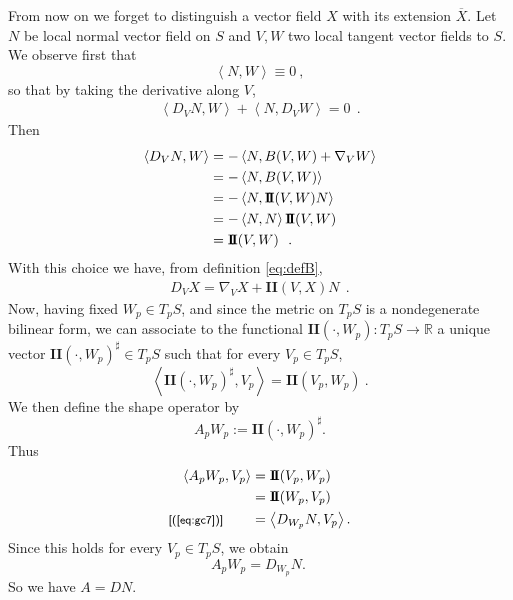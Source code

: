 \documentclass[a4paper,11pt,openright,twoside]{book}
\newcommand{\II}{\mathbf{I\!I}}
\newcommand{\1}{\mathds{1}}
\newcommand{\commb}[1]{\textsf{{\footnotesize[#1]}}}
\newcommand{\qref}[1]{(\ref{#1})}
\theoremstyle{plain}
\theoremstyle{definition}
\theoremstyle{remark}
\begin{document}
From now on we forget to distinguish a vector field $X$ with its extension $\overline{X}$. Let $N$ be local normal vector field on $S$ and $V,W$ two local tangent vector fields to $S$. We observe first that
\[\left<N,W \right> \equiv 0\ ,\] 
so that by taking the derivative along $V$,
\begin{align*}
	\left<D_V N,W \right> + \left<N,D_VW \right> = 0
	\ \ .
\end{align*}
Then
\begin{align}\label{eq:gc7}
	\left<D_VN,W \right> &= -\left<N,B(V,W)+\nabla_VW \right>\notag\\
	&= -\left<N,B(V,W) \right> \notag\\
	&= -\left<N,\II(V,W)N \right> \notag\\
	&= -\left<N,N \right>\II(V,W) \notag\\
	&=  \II(V,W)
\ \ . 
\end{align}
With this choice we have, from definition \ref{eq:defB},
\begin{align}\label{eq:gc1}
	\boxed{D_V X= \nabla_V X + \II(V,X)N }
\ \ . 
\end{align}
Now, having fixed $W_p\in T_pS$, and since the metric on $T_pS$ is a nondegenerate bilinear form, we can associate to the functional $\II(\cdot,W_p):T_pS\to \mathbb{R}$ a unique vector $\II(\cdot,W_p)^\sharp\in T_pS$ such that for every $V_p\in T_pS$,
\[
\left<\II(\cdot,W_p)^\sharp,V_p\right>=\II(V_p,W_p)\ .
\]
We then define the shape operator by
\[
A_pW_p:=\II(\cdot,W_p)^\sharp.
\]
Thus
\begin{align*}
\left<A_pW_p,V_p\right>
&=\II(V_p,W_p)\\
&=\II(W_p,V_p)\\
	\commb{\qref{eq:gc7}}\qquad &=\left<D_{W_p}N,V_p\right>.
\end{align*}
Since this holds for every $V_p\in T_pS$, we obtain
\[
A_pW_p=D_{W_p}N.\ 
\]
So we have $A = DN$.
\end{document}
